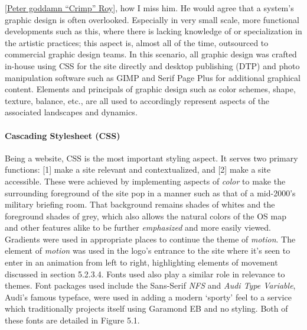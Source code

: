\documentclass[11pt, english]{article}
\begin{document}
	[\href{http://lewisbritton.com/Blog/Founding-Fathers.html}{Peter goddamn ``Crimp'' Roy}], how I miss him. He would agree that a system's graphic design is often overlooked. Especially in very small scale, more functional developments such as this, where there is lacking knowledge of or specialization in the artistic practices; this aspect is, almost all of the time, outsourced to commercial graphic design teams. In this scenario, all graphic design was crafted in-house using CSS for the site directly and desktop publishing (DTP) and photo manipulation software such as GIMP and Serif Page Plus for additional graphical content. Elements and principals of graphic design such as color schemes, shape, texture, balance, etc., are all used to accordingly represent aspects of the associated landscapes and dynamics.

			\paragraph{Cascading Stylesheet (CSS)}

	Being a website, CSS is the most important styling aspect. It serves two primary functions: [1] make a site relevant and contextualized, and [2] make a site accessible. These were achieved by implementing aspects of \textit{color} to make the surrounding foreground of the site pop in a manner such as that of a mid-2000's military briefing room. That background remains shades of whites and the foreground shades of grey, which also allows the natural colors of the OS map and other features alike to be further \textit{emphasized} and more easily viewed. Gradients were used in appropriate places to continue the theme of \textit{motion}. The element of \textit{motion} was used in the logo's entrance to the site where it's seen to enter in an animation from left to right, highlighting elements of movement discussed in section 5.2.3.4. Fonts used also play a similar role in relevance to themes. Font packages used include the Sans-Serif \textit{NFS} and \textit{Audi Type Variable}, Audi's famous typeface, were used in adding a modern `sporty' feel to a service which traditionally projects itself using Garamond EB and no styling. Both of these fonts are detailed in Figure 5.1.
\end{document}
